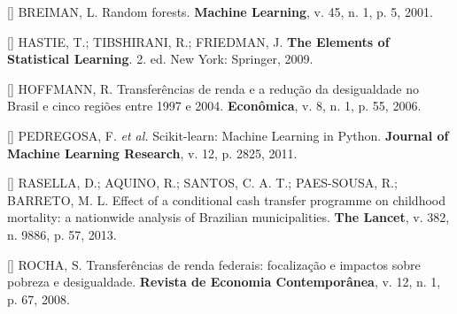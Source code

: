 \documentclass[12pt,a4paper,oneside]{article}
\begin{document}
\begin{singlespace}
\noindent\hangindent=1.25cm
[\theequation\label{ref:breiman}]
BREIMAN, L. Random forests. \textbf{Machine Learning}, v. 45, n. 1,
p. 5, 2001.\par\smallskip

\noindent\hangindent=1.25cm
[\theequation\label{ref:hastie}]
HASTIE, T.; TIBSHIRANI, R.; FRIEDMAN, J. \textbf{The Elements of
Statistical Learning}. 2. ed. New York: Springer, 2009.\par\smallskip

\noindent\hangindent=1.25cm
[\theequation\label{ref:hoffmann}]
HOFFMANN, R. Transferências de renda e a redução da desigualdade no
Brasil e cinco regiões entre 1997 e 2004. \textbf{Econômica}, v. 8,
n. 1, p. 55, 2006.\par\smallskip

\noindent\hangindent=1.25cm
[\theequation\label{ref:pedregosa}]
PEDREGOSA, F. \textit{et al.} Scikit-learn: Machine Learning in Python.
\textbf{Journal of Machine Learning Research}, v. 12, p.
2825, 2011.\par\smallskip

\noindent\hangindent=1.25cm
[\theequation\label{ref:rasella}]
RASELLA, D.; AQUINO, R.; SANTOS, C. A. T.; PAES-SOUSA, R.; BARRETO,
M. L. Effect of a conditional cash transfer programme on childhood
mortality: a nationwide analysis of Brazilian municipalities.
\textbf{The Lancet}, v. 382, n. 9886, p. 57, 2013.\par\smallskip

\noindent\hangindent=1.25cm
[\theequation\label{ref:rocha}]
ROCHA, S. Transferências de renda federais: focalização e impactos
sobre pobreza e desigualdade. \textbf{Revista de Economia
Contemporânea}, v. 12, n. 1, p. 67, 2008.\par\smallskip
\end{singlespace}
\end{document}
